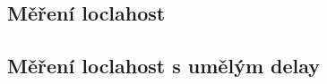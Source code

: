 \documentclass[11pt] {article}
\begin{document}
\subsection{Měření loclahost}
\newline
\subsection{Měření loclahost s umělým delay}
\newline
\end{document}
